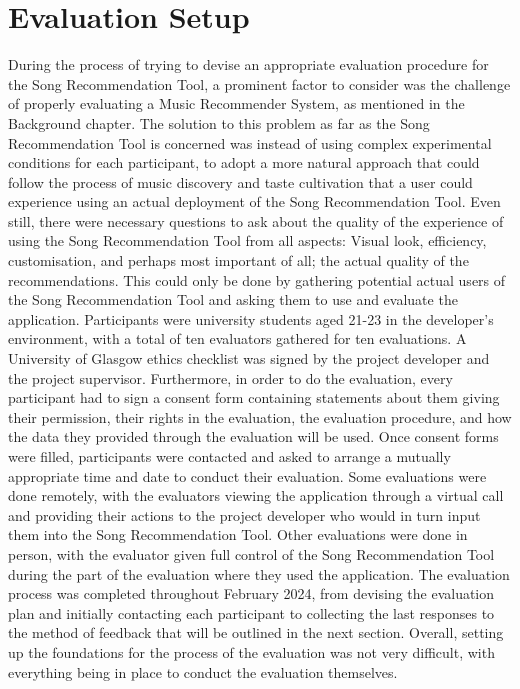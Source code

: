 \documentclass{l4proj}
\begin{document}
\section{Evaluation Setup}
During the process of trying to devise an appropriate evaluation procedure for the Song Recommendation Tool, a prominent factor to consider was the challenge of properly evaluating a Music Recommender System, as mentioned in the Background chapter. The solution to this problem as far as the Song Recommendation Tool is concerned was instead of using complex experimental conditions for each participant, to adopt a more natural approach that could follow the process of music discovery and taste cultivation that a user could experience using an actual deployment of the Song Recommendation Tool. Even still, there were necessary questions to ask about the quality of the experience of using the Song Recommendation Tool from all aspects: Visual look, efficiency, customisation, and perhaps most important of all; the actual quality of the recommendations. This could only be done by gathering potential actual users of the Song Recommendation Tool and asking them to use and evaluate the application. Participants were university students aged 21-23 in the developer's environment, with a total of ten evaluators gathered for ten evaluations. A University of Glasgow ethics checklist was signed by the project developer and the project supervisor. Furthermore, in order to do the evaluation, every participant had to sign a consent form containing statements about them giving their permission, their rights in the evaluation, the evaluation procedure, and how the data they provided through the evaluation will be used. Once consent forms were filled, participants were contacted and asked to arrange a mutually appropriate time and date to conduct their evaluation. Some evaluations were done remotely, with the evaluators viewing the application through a virtual call and providing their actions to the project developer who would in turn input them into the Song Recommendation Tool.
Other evaluations were done in person, with the evaluator given full control of the Song Recommendation Tool during the part of the evaluation where they used the application. The evaluation process was completed throughout February 2024, from devising the evaluation plan and initially contacting each participant to collecting the last responses to the method of feedback that will be outlined in the next section. Overall, setting up the foundations for the process of the evaluation was not very difficult, with everything being in place to conduct the evaluation themselves.
\end{document}
